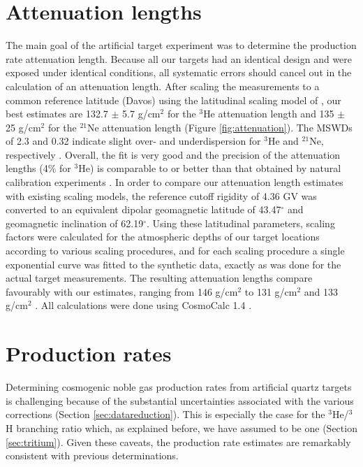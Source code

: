\documentclass{article}
\begin{document}
\section{Attenuation lengths}\label{sec:attenuation}

The main goal of the artificial target experiment was to determine the
production rate  attenuation length.  Because  all our targets  had an
identical  design and  were  exposed under  identical conditions,  all
systematic  errors  should  cancel   out  in  the  calculation  of  an
attenuation  length.   After  scaling  the measurements  to  a  common
reference  latitude (Davos)  using  the latitudinal  scaling model  of
\citet{desilets2006a}, our best estimates are 132.7 $\pm$ 5.7 g/cm$^2$
for the  $^3$He attenuation length and  135 $\pm$ 25  g/cm$^2$ for the
$^{21}$Ne  attenuation  length  (Figure  \ref{fig:attenuation}).   The
MSWDs of  2.3 and 0.32  indicate slight over- and  underdispersion for
$^3$He and $^{21}$Ne, respectively \citep{mcintyre1966}.  Overall, the
fit is very good and the precision of the attenuation lengths (4\% for
$^3$He)  is comparable  to or  better  than that  obtained by  natural
calibration experiments \citep[e.g.,  ][]{desilets2006b}.  In order to
compare our attenuation length estimates with existing scaling models,
the  reference  cutoff  rigidity  of  4.36  GV  was  converted  to  an
equivalent  dipolar   geomagnetic  latitude  of   43.47$^{\circ}$  and
geomagnetic inclination  of 62.19$^{\circ}$.  Using  these latitudinal
parameters, scaling factors were calculated for the atmospheric depths
of our  target locations according to various  scaling procedures, and
for each  scaling procedure a  single exponential curve was  fitted to
the  synthetic  data,  exactly  as  was done  for  the  actual  target
measurements.   The resulting  attenuation lengths  compare favourably
with  our   estimates,  ranging  from   146  g/cm$^2$  \citep{lal1991,
  stone2000} to  131 g/cm$^2$ \citep{dunai2000,  desilets2003} and 133
g/cm$^2$  \citep{desilets2006a}.   All  calculations were  done  using
CosmoCalc 1.4 \citep{vermeesch2007c}.

\section{Production rates}\label{sec:P}

Determining  cosmogenic  noble gas  production  rates from  artificial
quartz targets is challenging because of the substantial uncertainties
associated      with     the     various      corrections     (Section
\ref{sec:datareduction}).   This  is   especially  the  case  for  the
$^3$He/$^3$H  branching  ratio which,  as  explained  before, we  have
assumed to  be one (Section \ref{sec:tritium}).   Given these caveats,
the production rate estimates  are remarkably consistent with previous
determinations.
\\
\end{document}

